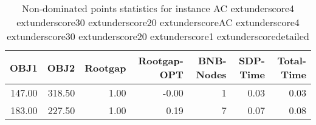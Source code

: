 \begin{table}
\caption{Non-dominated points statistics for instance AC	extunderscore4	extunderscore30	extunderscore20	extunderscoreAC	extunderscore4	extunderscore30	extunderscore20	extunderscore1	extunderscoredetailed}
\label{tab:stats/AC_4_30_20_AC_4_30_20_1_detailed}
\begin{tabular}{rrrrrrr}
\toprule
OBJ1 & OBJ2 & Rootgap & Rootgap-OPT & BNB-Nodes & SDP-Time & Total-Time \\
\midrule
147.00 & 318.50 & 1.00 & -0.00 & 1 & 0.03 & 0.03 \\
183.00 & 227.50 & 1.00 & 0.19 & 7 & 0.07 & 0.08 \\
\bottomrule
\end{tabular}
\end{table}
